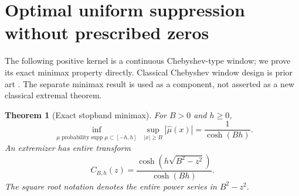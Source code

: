 \documentclass[11pt]{article}
\newtheorem{theorem}{Theorem}
\theoremstyle{remark}\newtheorem{remark}[theorem]{Remark}
\begin{document}
\section{Optimal uniform suppression without prescribed zeros}
The following positive kernel is a continuous Chebyshev-type window; we prove its exact minimax property directly. Classical Chebyshev window design is prior art \cite{cheb}. The separate minimax result is used as a component, not asserted as a new classical extremal theorem.
\begin{theorem}[Exact stopband minimax]\label{thm:stop}
For $B>0$ and $h\ge0$,
\[
 \inf_{\substack{\mu\text{ probability}\operatorname{supp}\mu\subset[-h,h]}}
  \sup_{|x|\ge B}|\widehat\mu(x)|=\frac1{\cosh(Bh)}.
\]
An extremizer has entire transform
\begin{equation}\label{eq:cheb}
 C_{B,h}(z)=\frac{\cosh(h\sqrt{B^2-z^2})}{\cosh(Bh)}.
\end{equation}
The square root notation denotes the entire power series in $B^2-z^2$.
\end{theorem}
\end{document}
